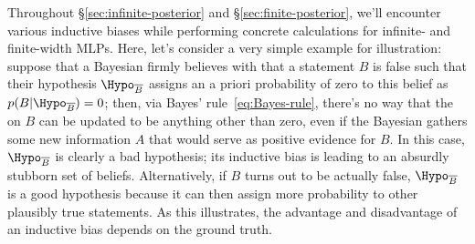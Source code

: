 Throughout \S\ref{sec:infinite-posterior} and \S\ref{sec:finite-posterior}, we'll encounter various 
inductive biases  while performing concrete calculations for infinite- and finite-width MLPs.
Here, let's consider a very simple example for illustration: suppose that a Bayesian firmly believes with  that a statement $B$ is false such that their hypothesis $\Hypo_{\overline{B}}$ assigns an a priori probability of zero to this belief as $p(B\vert\Hypo_{\overline{B}})=0$; then, via Bayes' rule~\eqref{eq:Bayes-rule}, there's no way that the  on $B$ can be updated to be anything other than zero, even if the Bayesian gathers some new information $A$ that would serve as positive evidence for $B$. In this case,
$\Hypo_{\overline{B}}$ is clearly a bad hypothesis; its inductive bias is leading to an absurdly stubborn set of beliefs. Alternatively, if $B$ turns out to be actually false, $\Hypo_{\overline{B}}$ is a good hypothesis because it can then assign more probability to other plausibly true statements. As this  illustrates, the advantage and disadvantage of an inductive bias depends on the ground truth.










